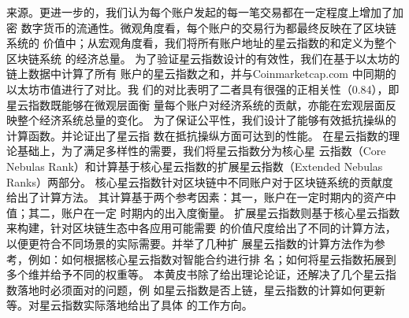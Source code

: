 来源。更进一步的，我们认为每个账户发起的每一笔交易都在一定程度上增加了加密
数字货币的流通性。微观角度看，每个账户的交易行为都最终反映在了区块链系统的
价值中；从宏观角度看，我们将所有账户地址的星云指数的和定义为整个区块链系统
的经济总量。
为了验证星云指数设计的有效性，我们在基于以太坊的链上数据中计算了所有
账户的星云指数之和，并与Coinmarketcap.com 中同期的以太坊市值进行了对比。我
们的对比表明了二者具有很强的正相关性（0.84），即星云指数既能够在微观层面衡
量每个账户对经济系统的贡献，亦能在宏观层面反映整个经济系统总量的变化。
为了保证公平性，我们设计了能够有效抵抗操纵的计算函数。并论证出了星云指
数在抵抗操纵方面可达到的性能。
在星云指数的理论基础上，为了满足多样性的需要，我们将星云指数分为核心星
云指数（Core Nebulas Rank）和计算基于核心星云指数的扩展星云指数（Extended
Nebulas Ranks）两部分。
核心星云指数针对区块链中不同账户对于区块链系统的贡献度给出了计算方法。
其计算基于两个参考因素：其一，账户在一定时期内的资产中值；其二，账户在一定
时期内的出入度衡量。
扩展星云指数则基于核心星云指数来构建，针对区块链生态中各应用可能需要
的价值尺度给出了不同的计算方法，以便更符合不同场景的实际需要。并举了几种扩
展星云指数的计算方法作为参考，例如：如何根据核心星云指数对智能合约进行排
名；如何将星云指数拓展到多个维并给予不同的权重等。
本黄皮书除了给出理论论证，还解决了几个星云指数落地时必须面对的问题，例
如星云指数是否上链，星云指数的计算如何更新等。对星云指数实际落地给出了具体
的工作方向。

